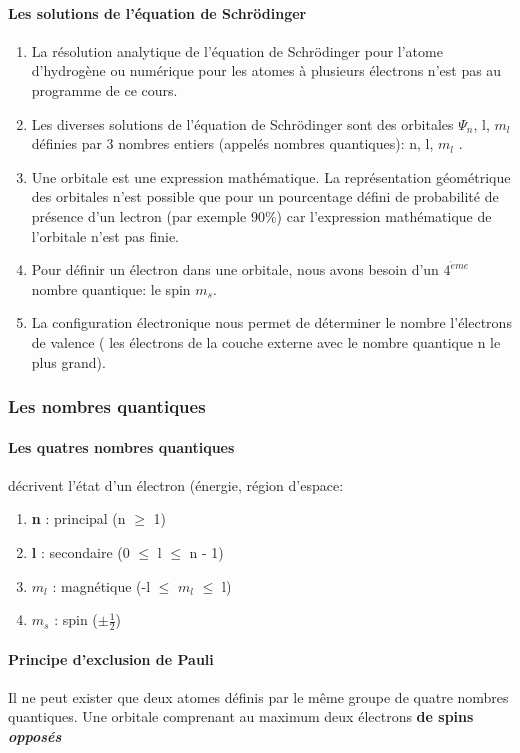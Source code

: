 \documentclass[10pt,a4paper]{book}
\begin{document}
\paragraph{Les solutions de l'équation de Schrödinger}
\begin{enumerate}
\item La résolution analytique de l’équation de Schrödinger pour l’atome d’hydrogène ou numérique pour les atomes à plusieurs électrons n’est pas au programme de ce cours.
\item Les diverses solutions de l’équation de Schrödinger sont des orbitales $\Psi_n$, l, $m_l$ définies par 3 nombres entiers (appelés nombres quantiques): n, l, $m_l$ .
\item Une orbitale est une expression mathématique. La représentation géométrique des orbitales n’est possible que pour un pourcentage défini de probabilité de présence d’un lectron (par exemple 90\%) car l’expression mathématique de l’orbitale n’est pas finie.
\item  Pour définir un électron dans une orbitale, nous avons besoin d’un $4^{\grave{e}me}$ nombre quantique: le spin $m_s$. \label{spin}
\item  La configuration électronique nous permet de déterminer le nombre l'électrons de valence ( les électrons de la couche externe avec le nombre quantique n le plus grand).
\end{enumerate}
\subsubsection{Les nombres quantiques}
\paragraph{Les quatres nombres quantiques} décrivent l'état d'un électron (énergie, région d'espace:
\begin{enumerate}
\item \textbf{n} : principal (n $\geq$ 1)
\item \textbf{l} : secondaire (0 $\leq$ l $\leq$ n - 1) 
\item \textbf{$m_l$} : magnétique (-l $\leq$ $m_l$ $\leq$ l)
\item \textbf{$m_s$} : spin ($\pm \frac{1}{2}$)
\end{enumerate}
\paragraph{Principe d'exclusion de Pauli} Il ne peut exister que deux atomes définis par le même groupe de quatre nombres quantiques. Une orbitale comprenant au maximum deux électrons \textbf{de spins \textit{opposés}} \label{eq:1}
\end{document}
